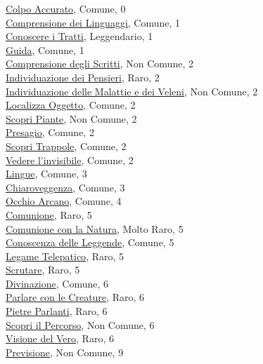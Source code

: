 \begin{multicols}{3}
{{\hyperlink{Colpo Accurato}{Colpo Accurato}, Comune, 0\\
\hyperlink{Comprensione dei Linguaggi}{Comprensione dei Linguaggi}, Comune, 1\\
\hyperlink{Conoscere i Tratti}{Conoscere i Tratti}, Leggendario, 1\\
\hyperlink{Guida}{Guida}, Comune, 1\\
\hyperlink{Comprensione degli Scritti}{Comprensione degli Scritti}, Non Comune, 2\\
\hyperlink{Individuazione dei Pensieri}{Individuazione dei Pensieri}, Raro, 2\\
\hyperlink{Individuazione delle Malattie e dei Veleni}{Individuazione delle Malattie e dei Veleni}, Non Comune, 2\\
\hyperlink{Localizza Oggetto}{Localizza Oggetto}, Comune, 2\\
\hyperlink{Scopri Piante}{Scopri Piante}, Non Comune, 2\\
\hyperlink{Presagio}{Presagio}, Comune, 2\\
\hyperlink{Scopri Trappole}{Scopri Trappole}, Comune, 2\\
\hyperlink{Vedere l'invisibile}{Vedere l'invisibile}, Comune, 2\\
\hyperlink{Lingue}{Lingue}, Comune, 3\\
\hyperlink{Chiaroveggenza}{Chiaroveggenza}, Comune, 3\\
\hyperlink{Occhio Arcano}{Occhio Arcano}, Comune, 4\\
\hyperlink{Comunione}{Comunione}, Raro, 5\\
\hyperlink{Comunione con la Natura}{Comunione con la Natura}, Molto Raro, 5\\
\hyperlink{Conoscenza delle Leggende}{Conoscenza delle Leggende}, Comune, 5\\
\hyperlink{Legame Telepatico}{Legame Telepatico}, Raro, 5\\
\hyperlink{Scrutare}{Scrutare}, Raro, 5\\
\hyperlink{Divinazione}{Divinazione}, Comune, 6\\
\hyperlink{Parlare con le Creature}{Parlare con le Creature}, Raro, 6\\
\hyperlink{Pietre Parlanti}{Pietre Parlanti}, Raro, 6\\
\hyperlink{Scopri il Percorso}{Scopri il Percorso}, Non Comune, 6\\
\hyperlink{Visione del Vero}{Visione del Vero}, Raro, 6\\
\hyperlink{Previsione}{Previsione}, Non Comune, 9

}}
\end{multicols}
